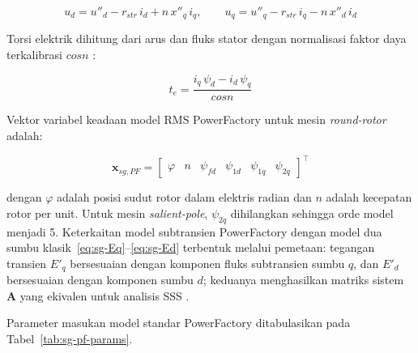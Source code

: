 \begin{equation}
  u_d = u''_d - r_{str}\,i_d + n\,x''_q\,i_q, \qquad
  u_q = u''_q - r_{str}\,i_q - n\,x''_d\,i_d
  \label{eq:sg-pf-rms-volt}
\end{equation}

Torsi elektrik dihitung dari arus dan fluks stator dengan normalisasi faktor daya
terkalibrasi $cosn$ \cite{digsilent2024sm}:

\begin{equation}
  t_e = \frac{i_q\,\psi_d - i_d\,\psi_q}{cosn}
  \label{eq:sg-pf-te}
\end{equation}

Vektor variabel keadaan model RMS PowerFactory untuk mesin \textit{round-rotor} adalah:

\begin{equation}
  \mathbf{x}_{sg,PF} =
  \begin{bmatrix}\varphi & n & \psi_{fd} & \psi_{1d} & \psi_{1q} & \psi_{2q}\end{bmatrix}^\top
  \label{eq:sg-pf-statevec}
\end{equation}

dengan $\varphi$ adalah posisi sudut rotor dalam elektris radian dan $n$ adalah kecepatan
rotor per unit. Untuk mesin \textit{salient-pole}, $\psi_{2q}$ dihilangkan sehingga
orde model menjadi 5. Keterkaitan model subtransien PowerFactory dengan model dua sumbu
klasik~\eqref{eq:sg-Eq}--\eqref{eq:sg-Ed} terbentuk melalui pemetaan: tegangan transien
$E'_q$ bersesuaian dengan komponen fluks subtransien sumbu $q$, dan $E'_d$ bersesuaian
dengan komponen sumbu $d$; keduanya menghasilkan matriks sistem $\mathbf{A}$ yang
ekivalen untuk analisis SSS \cite{digsilent2024sm}.

Parameter masukan model standar PowerFactory ditabulasikan pada
Tabel~\ref{tab:sg-pf-params}.

